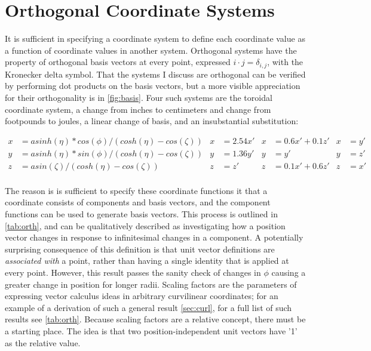 \documentclass{article}
\begin{document}
\section*{Orthogonal Coordinate Systems}

It is sufficient in specifying a coordinate system to define each coordinate value as a function of coordinate values in another system. Orthogonal systems have the property of orthogonal basis vectors at every point, expressed $\unit{i} \cdot \unit{j} = \delta_{i,j}$, with the Kronecker delta symbol. That the systems I discuss are orthogonal can be verified by performing dot products on the basis vectors, but a more visible appreciation for their orthogonality is in \cref{fig:basis}. Four such systems are the toroidal coordinate system, a change from inches to centimeters and change from footpounds to joules, a linear change of basis, and an insubstantial substitution:

\begin{align*}
x &= a sinh(\eta) * cos(\phi) / (cosh(\eta) - cos(\zeta)) & x &= 2.54 x'  & x &= 0.6 x' + 0.1 z' & x &= y'\\
y &= a sinh(\eta) * sin(\phi) / (cosh(\eta) - cos(\zeta)) & y &= 1.36 y'  & y &= y'              & y &= z' \\
z &= a sin(\zeta) / (cosh(\eta) - cos(\zeta))             & z &= z'       & z &= 0.1 x' + 0.6 z' & z &= x' \\
\end{align*}

The reason is is sufficient to specify these coordinate functions it that a coordinate consists of components and basis vectors, and the component functions can be used to generate basis vectors. This process is outlined in \cref{tab:orth}, and can be qualitatively described as investigating how a position vector changes in response to infinitesimal changes in a component. A potentially surprising consequence of this definition is that unit vector definitions are \textit{associated with} a point, rather than having a single identity that is applied at every point. However, this result passes the sanity check of changes in $\unit{\phi}$ causing a greater change in position for longer radii. Scaling factors are the parameters of expressing vector calculus ideas in arbitrary curvilinear coordinates; for an example of a derivation of such a general result \cref{sec:curl}, for a full list of such results see \cref{tab:orth}. Because scaling factors are a relative concept, there must be a starting place. The idea is that two position-independent unit vectors have '1' as the relative value.
\end{document}
